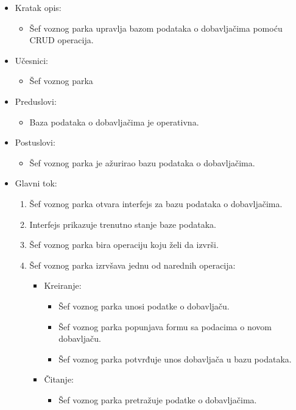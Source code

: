 \begin{itemize}
	\item Kratak opis:
		\begin{itemize}
			\item Šef voznog parka upravlja bazom podataka o dobavljačima pomoću CRUD operacija.
		\end{itemize}
	\item Učesnici:
		\begin{itemize}
		    \item Šef voznog parka
		\end{itemize}
	\item Preduslovi:
		\begin{itemize}
		    \item Baza podataka o dobavljačima je operativna.
		\end{itemize}
	\item Postuslovi:
		\begin{itemize}
			\item Šef voznog parka je ažurirao bazu podataka o dobavljačima.
	    \end{itemize}
	\item Glavni tok:
		\begin{enumerate}
		    \item Šef voznog parka otvara interfejs za bazu podataka o dobavljačima.
		    \item Interfejs prikazuje trenutno stanje baze podataka.
		    \item Šef voznog parka bira operaciju koju želi da izvrši.
			\item Šef voznog parka izrvšava jednu od narednih operacija:
			\begin{itemize}
                \item Kreiranje:
                \begin{itemize}
                    \item Šef voznog parka unosi podatke o dobavljaču.
                    \item Šef voznog parka popunjava formu sa podacima o novom dobavljaču.
                    \item Šef voznog parka potvrđuje unos dobavljača u bazu podataka.
                \end{itemize}
                \item Čitanje:
                \begin{itemize}
                    \item Šef voznog parka pretražuje podatke o dobavljačima.

\end{itemize}
\end{itemize}
\end{enumerate}
\end{itemize}
